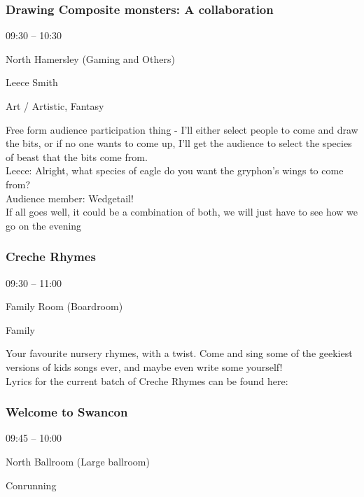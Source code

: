 \documentclass{scrreprt}
\begin{document}
\begin{multicols}{2}
\subsubsection*{Drawing Composite monsters: A collaboration}\begin{description}
\setlength{\itemsep}{0pt}
\setlength{\parsep}{0pt}
\setlength{\parskip}{0pt}
\item[Time:]{09:30 -- 10:30}
\item[Venue:]{North Hamersley (Gaming and Others)}
\item[People:]{Leece Smith}
\item[Tags:]{Art / Artistic, Fantasy}\end{description}
Free form audience participation thing - I'll either select people to come and draw the bits, or if no one wants to come up, I'll get the audience to select the species of beast that the bits come from.\\Leece: Alright, what species of eagle do you want the gryphon's wings to come from? \\Audience member: Wedgetail!\\If all goes well, it could be a combination of both, we will just have to see how we go on the evening
\subsubsection*{Creche Rhymes}\begin{description}
\setlength{\itemsep}{0pt}
\setlength{\parsep}{0pt}
\setlength{\parskip}{0pt}
\item[Time:]{09:30 -- 11:00}
\item[Venue:]{Family Room (Boardroom)}
\item[Tags:]{Family}\end{description}
Your favourite nursery rhymes, with a twist. Come and sing some of the geekiest versions of kids songs ever, and maybe even write some yourself!\\Lyrics for the current batch of Creche Rhymes can be found here:
\subsubsection*{Welcome to Swancon}\begin{description}
\setlength{\itemsep}{0pt}
\setlength{\parsep}{0pt}
\setlength{\parskip}{0pt}
\item[Time:]{09:45 -- 10:00}
\item[Venue:]{North Ballroom (Large ballroom)}
\item[Tags:]{Conrunning}\end{description}


\end{multicols}
\end{document}
